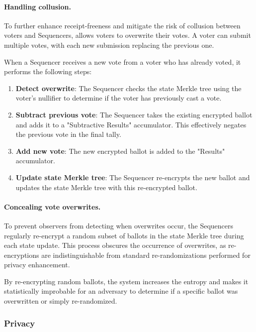 \paragraph{Handling collusion.}

To further enhance receipt-freeness and mitigate the risk of collusion between voters and Sequencers, \davinci allows voters to overwrite their votes. A voter can submit multiple votes, with each new submission replacing the previous one.

When a Sequencer receives a new vote from a voter who has already voted, it performs the following steps:

\begin{enumerate}
	\item \textbf{Detect overwrite}: The Sequencer checks the state Merkle tree using the voter's nullifier to determine if the voter has previously cast a vote.
	\item \textbf{Subtract previous vote}: The Sequencer takes the existing encrypted ballot and adds it to a "Subtractive Results" accumulator. This effectively negates the previous vote in the final tally.
	\item \textbf{Add new vote}: The new encrypted ballot is added to the "Results" accumulator.
	\item \textbf{Update state Merkle tree}: The Sequencer re-encrypts the new ballot and updates the state Merkle tree with this re-encrypted ballot.
\end{enumerate}

\paragraph{Concealing vote overwrites.}

To prevent observers from detecting when overwrites occur, the Sequencers regularly re-encrypt a random subset of ballots in the state Merkle tree during each state update. This process obscures the occurrence of overwrites, as re-encryptions are indistinguishable from standard re-randomizations performed for privacy enhancement.

By re-encrypting random ballots, the system increases the entropy and makes it statistically improbable for an adversary to determine if a specific ballot was overwritten or simply re-randomized.

\subsubsection{Privacy}

